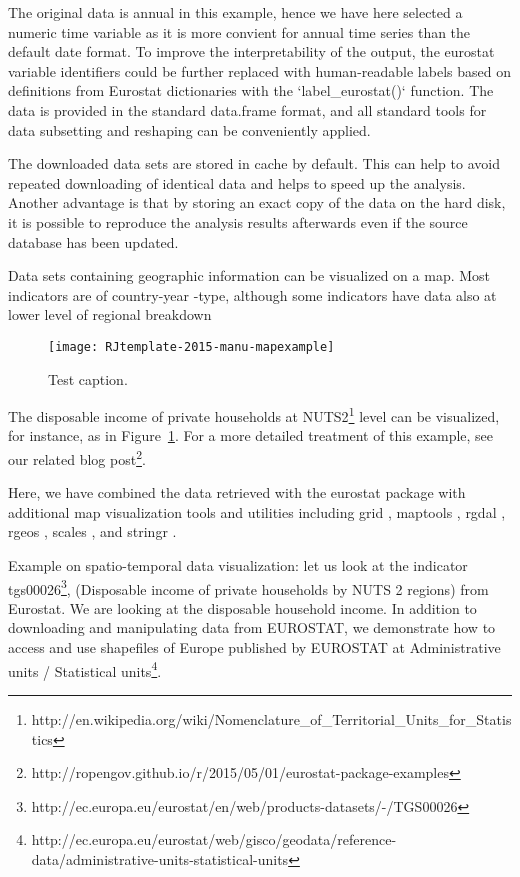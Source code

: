 The original data is annual in this example, hence we have here
selected a numeric time variable as it is more convient for annual
time series than the default date format. To improve the
interpretability of the output, the eurostat variable identifiers
could be further replaced with human-readable labels based on
definitions from Eurostat dictionaries with the `label\_eurostat()`
function. The data is provided in the standard data.frame format, and
all standard tools for data subsetting and reshaping can be
conveniently applied.

The downloaded data sets are stored in cache by default. This can help
to avoid repeated downloading of identical data and helps to speed up
the analysis. Another advantage is that by storing an exact copy of
the data on the hard disk, it is possible to reproduce the analysis
results afterwards even if the source database has been updated.

Data sets containing geographic information can be visualized on a
map. Most indicators are of country-year -type, although some
indicators have data also at lower level of regional breakdown

\begin{figure}
\begin{center}
\texttt{[image: RJtemplate-2015-manu-mapexample]}
\caption{Test caption.}
\label{fig:mapexample}
\end{center}
\end{figure}


The disposable income of private households at
NUTS2\footnote{http://en.wikipedia.org/wiki/Nomenclature\_of\_Territorial\_Units\_for\_Statistics}
level can be visualized, for instance, as in
Figure~\ref{fig:mapexample}. For a more detailed treatment of this
example, see our related blog
post\footnote{http://ropengov.github.io/r/2015/05/01/eurostat-package-examples}.


Here, we have combined the data retrieved with the eurostat package
with additional map visualization tools and utilities including
grid \citep{grid}, maptools \citep{maptools}, rgdal \citep{rgdal},
rgeos \citep{rgeos}, scales \citep{scales}, and
stringr \citep{stringr}.

Example on spatio-temporal data visualization: let us look at the indicator tgs00026\footnote{http://ec.europa.eu/eurostat/en/web/products-datasets/-/TGS00026}, (Disposable income of private households by NUTS 2 regions) from Eurostat. We are looking at the disposable household income. In addition to downloading and manipulating data from EUROSTAT, we demonstrate how to access and use shapefiles of Europe published by EUROSTAT at Administrative units / Statistical units\footnote{http://ec.europa.eu/eurostat/web/gisco/geodata/reference-data/administrative-units-statistical-units}.



